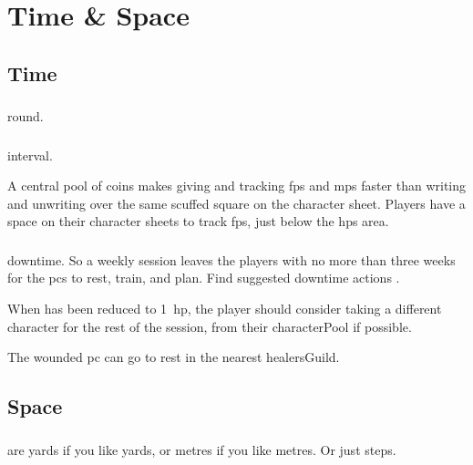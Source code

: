 \pagebreak[0]
\section{Time \& Space}

\begin{multicols}{2}

\subsection{Time}
\label{time}

\subsubsection{}
\glsdesc{round}.


\subsubsection{}
\glsdesc{interval}.

A central pool of coins makes giving and tracking \glspl{fp} and \glspl{mp} faster than writing and unwriting over the same scuffed square on the character sheet.
Players have a space on their character sheets to track \glspl{fp}, just below the \glspl{hp} area.

\subsubsection{}
\glsdesc{downtime}.
So a weekly session leaves the players with no more than three weeks for the \glspl{pc} to rest, train, and plan.
Find suggested \gls{downtime} actions .

\label{healing}
When  has been reduced to 1~\gls{hp}, the player should consider taking a different character for the rest of the session, from their \gls{characterPool} if possible.

The wounded \gls{pc} can go to rest in the nearest \gls{healersGuild}.

\subsection{Space}
\label{space}

\subsubsection{}
are yards if you like yards, or metres if you like metres.
Or just \glspl{step}.


\end{multicols}
